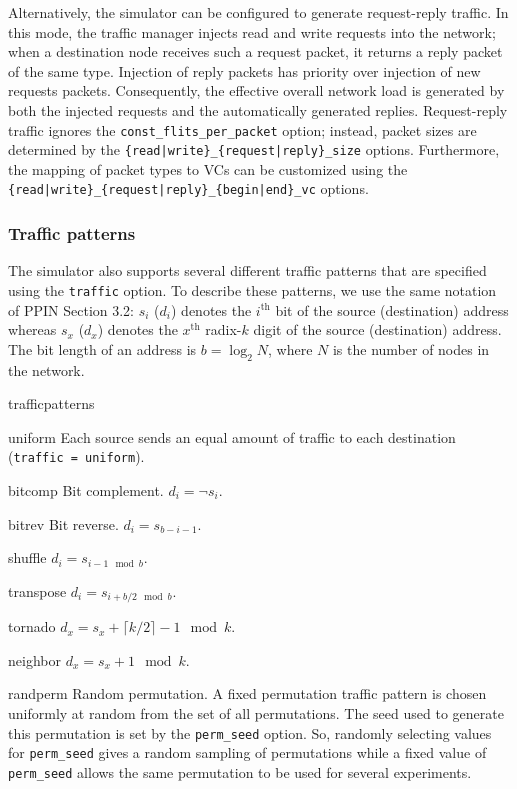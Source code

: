 \documentclass[11pt]{article}
\begin{document}
{Alternatively, the simulator can be configured to generate request-reply 
traffic. In this mode, the traffic manager injects read and write requests 
into the network; when a destination node receives such a request 
packet, it returns a reply packet of the same type. Injection of reply 
packets has priority over injection of new requests packets. 
Consequently, the effective overall network load is generated by both 
the injected requests and the automatically generated replies. 
Request-reply traffic ignores the \texttt{const\_flits\_per\_packet} 
option; instead, packet sizes are determined by the 
\texttt{\{read|write\}\_\{request|reply\}\_size} options. Furthermore, 
the mapping of packet types to VCs can be customized using the 
\texttt{\{read|write\}\_\{request|reply\}\_\{begin|end\}\_vc} options.

\subsubsection{Traffic patterns}
The simulator also supports several different traffic patterns that
are specified using the \texttt{traffic} option.  To describe these
patterns, we use the same notation of PPIN Section 3.2: $s_i$ ($d_i$)
denotes the $i^\textrm{th}$ bit of the source (destination) address
whereas $s_x$ ($d_x$) denotes the $x^\textrm{th}$ radix-$k$ digit of
the source (destination) address.  The bit length of an address is $b
= \log_2 N$, where $N$ is the number of nodes in the network.

\begin{opt_list}{trafficpatterns}
\item[uniform] Each source sends an equal amount of traffic to each
destination (\texttt{traffic = uniform}).
\item[bitcomp] Bit complement. $d_i = \neg s_i$.
\item[bitrev] Bit reverse. $d_i = s_{b-i-1}$.
\item[shuffle] $d_i = s_{i-1 \mod b}$.
\item[transpose] $d_i = s_{i+b/2 \mod b}$.
\item[tornado] $d_x = s_x + \lceil k/2 \rceil - 1 \mod k$.
\item[neighbor] $d_x = s_x + 1 \mod k$.
\item[randperm] Random permutation.  A fixed permutation traffic
pattern is chosen uniformly at random from the set of all
permutations.  The seed used to generate this permutation is set by
the \texttt{perm\_seed} option.  So, randomly selecting values for
\texttt{perm\_seed} gives a random sampling of permutations while a
fixed value of \texttt{perm\_seed} allows the same permutation to be
used for several experiments.
\end{opt_list}

}
\end{document}
